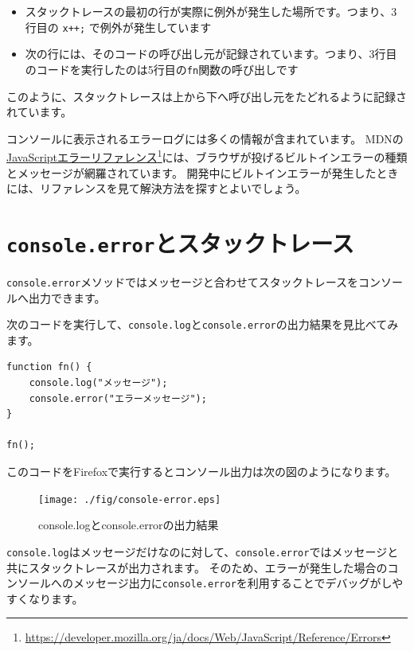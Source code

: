 \begin{itemize}
\item
  スタックトレースの最初の行が実際に例外が発生した場所です。つまり、3行目の
  \texttt{x++;} で例外が発生しています
\item
  次の行には、そのコードの呼び出し元が記録されています。つまり、3行目のコードを実行したのは5行目の\texttt{fn}関数の呼び出しです
\end{itemize}
\newpage
このように、スタックトレースは上から下へ呼び出し元をたどれるように記録されています。

コンソールに表示されるエラーログには多くの情報が含まれています。
MDNの\href{https://developer.mozilla.org/ja/docs/Web/JavaScript/Reference/Errors}{JavaScriptエラーリファレンス}\footnote{\url{https://developer.mozilla.org/ja/docs/Web/JavaScript/Reference/Errors}}には、ブラウザが投げるビルトインエラーの種類とメッセージが網羅されています。
開発中にビルトインエラーが発生したときには、リファレンスを見て解決方法を探すとよいでしょう。

\hypertarget{console.error}{%
\section{\texorpdfstring{\texttt{console.error}とスタックトレース}{console.errorとスタックトレース}}\label{console.error}}

\texttt{console.error}メソッドではメッセージと合わせてスタックトレースをコンソールへ出力できます。

次のコードを実行して、\texttt{console.log}と\texttt{console.error}の出力結果を見比べてみます。

\begin{lstlisting}
function fn() {
    console.log("メッセージ");
    console.error("エラーメッセージ");
}

fn();
\end{lstlisting}

このコードをFirefoxで実行するとコンソール出力は次の図のようになります。

\begin{figure}[h]
\centering
\texttt{[image: ./fig/console-error.eps]}
\caption{console.logとconsole.errorの出力結果}
\end{figure}

\texttt{console.log}はメッセージだけなのに対して、\texttt{console.error}ではメッセージと共にスタックトレースが出力されます。
そのため、エラーが発生した場合のコンソールへのメッセージ出力に\texttt{console.error}を利用することでデバッグがしやすくなります。

